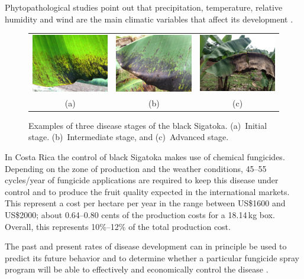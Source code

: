\documentclass[review,authoryear,english]{elsarticle}
\begin{document}
Phytopathological studies point out that precipitation, temperature,
relative humidity and wind are the main climatic variables that affect
its development \citep{MarinVargas1995}.
 	 
\begin{figure}[h] 
\centering
\begin{tabular}{c@{\;}c@{\;}c}
  \includegraphics[width=.32\linewidth]{Roya_a} &
  \includegraphics[width=.32\linewidth]{Roya_b} &
  \includegraphics[width=.32\linewidth]{Roya_c} \\
  (a) & (b) & (c) 
\end{tabular}
\caption{Examples of three disease stages of the black Sigatoka. (a)~Initial stage. (b)~Intermediate stage, and (c)~Advanced stage.} 
\label{fig:diseasestages} 
\end{figure}

In Costa Rica the control of black Sigatoka makes use of chemical fungicides.
%
Depending on the zone of production and the weather conditions, 45--55
cycles/year of fungicide applications are required to keep this
disease under control and to produce the fruit quality expected in the
international markets.
%
This represent a cost per hectare per year in the range between US\$1600 and
US\$2000; about 0.64--0.80 cents of the production costs for a
18.14\,kg box.
%
Overall, this represents 10\%--12\% of the total production cost.

The past and present rates of disease development can in principle be used
to predict its future behavior and to determine whether
a particular fungicide spray program will be able to effectively and
economically control the disease \citet{ChuangJeger1987}.
\end{document}
